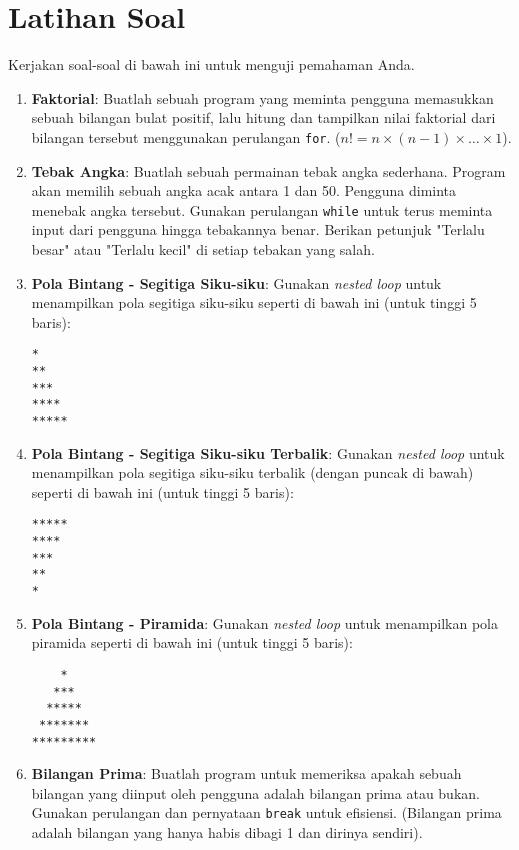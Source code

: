 \section{Latihan Soal}
Kerjakan soal-soal di bawah ini untuk menguji pemahaman Anda.

\begin{enumerate}
    \item \textbf{Faktorial}: Buatlah sebuah program yang meminta pengguna memasukkan sebuah bilangan bulat positif, lalu hitung dan tampilkan nilai faktorial dari bilangan tersebut menggunakan perulangan \texttt{for}. ($n! = n \times (n-1) \times \dots \times 1$).
    
    \item \textbf{Tebak Angka}: Buatlah sebuah permainan tebak angka sederhana. Program akan memilih sebuah angka acak antara 1 dan 50. Pengguna diminta menebak angka tersebut. Gunakan perulangan \texttt{while} untuk terus meminta input dari pengguna hingga tebakannya benar. Berikan petunjuk "Terlalu besar" atau "Terlalu kecil" di setiap tebakan yang salah.
    
    \item \textbf{Pola Bintang - Segitiga Siku-siku}: Gunakan \textit{nested loop} untuk menampilkan pola segitiga siku-siku seperti di bawah ini (untuk tinggi 5 baris):
    \begin{verbatim}
*
**
***
****
*****
    \end{verbatim}

    \item \textbf{Pola Bintang - Segitiga Siku-siku Terbalik}: Gunakan \textit{nested loop} untuk menampilkan pola segitiga siku-siku terbalik (dengan puncak di bawah) seperti di bawah ini (untuk tinggi 5 baris):
    \begin{verbatim}
*****
****
***
**
*
    \end{verbatim}

    \item \textbf{Pola Bintang - Piramida}: Gunakan \textit{nested loop} untuk menampilkan pola piramida seperti di bawah ini (untuk tinggi 5 baris):
    \begin{verbatim}
    *
   ***
  *****
 *******
*********
    \end{verbatim}
    
    \item \textbf{Bilangan Prima}: Buatlah program untuk memeriksa apakah sebuah bilangan yang diinput oleh pengguna adalah bilangan prima atau bukan. Gunakan perulangan dan pernyataan \texttt{break} untuk efisiensi. (Bilangan prima adalah bilangan yang hanya habis dibagi 1 dan dirinya sendiri).

\end{enumerate}
